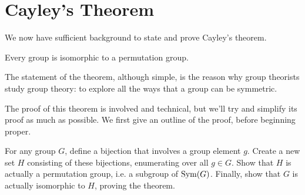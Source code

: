 \section{Cayley's Theorem}
We now have sufficient background to state and prove Cayley's theorem.

\begin{theorem}[Cayley]\label{thrm-cayley}
    Every group is isomorphic to a permutation group.
\end{theorem}

The statement of the theorem, although simple, is the reason why group theorists study group theory: to explore all the ways that a group can be symmetric.

The proof of this theorem is involved and technical, but we'll try and simplify its proof as much as possible. We first give an outline of the proof, before beginning proper.
\begin{proofsketch}
    For any group $G$, define a bijection that involves a group element $g$. Create a new set $H$ consisting of these bijections, enumerating over all $g \in G$. Show that $H$ is actually a permutation group, i.e. a subgroup of $\mathrm{Sym}(G)$. Finally, show that $G$ is actually isomorphic to $H$, proving the theorem.
\end{proofsketch}

